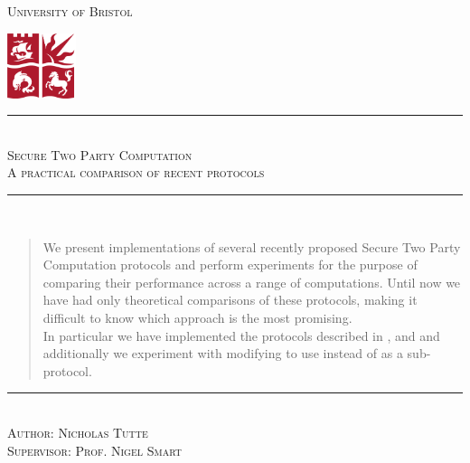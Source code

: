 \documentclass[a4paper,11pt]{article}
\newcommand{\HRule}{\rule{\linewidth}{0.5mm}}
\begin{document}
	\begin{titlepage}
		\begin{center}

			\textsc{\LARGE University of Bristol}
			\vspace{2cm}
    
			\includegraphics[width=0.15\textwidth]{./bristolunilogo}~\\[1cm]
    
			\vspace{3cm}
			\HRule \\[0.4cm]
			\textsc{ \huge Secure Two Party Computation}\\
			\textsc{ \large A practical comparison of recent protocols}\\
			\HRule \\[0.4cm]
			\vspace{2cm}
    
			\begin{abstract}
				We present implementations of several recently proposed Secure Two Party Computation protocols and perform experiments for the purpose of comparing their performance across a range of computations. Until now we have had only theoretical comparisons of these protocols, making it difficult to know which approach is the most promising.\\
				
				In particular we have implemented the protocols described in \cite{LindellAndPinkas2011}, \cite{Lindell_CnC_2013} and \cite{Katz_Symm_CnC_2013} and additionally we experiment with modifying \cite{Lindell_CnC_2013} to use \cite{Katz_Symm_CnC_2013} instead of \cite{LindellAndPinkas2011} as a sub-protocol.
			\end{abstract}
    
			\vspace{2.6cm}
			\noindent\rule{12cm}{0.2pt}\\[0.2cm]
			\textsc{\Large Author: Nicholas Tutte}\\[0.2cm]
			\textsc{\Large Supervisor: Prof. Nigel Smart}
    
		\end{center}
	\end{titlepage}


\end{document}
